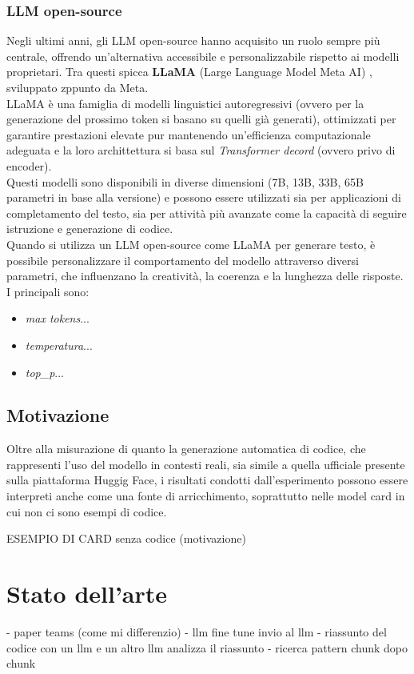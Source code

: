 \documentclass{article}
\begin{document}
\subsubsection{LLM open-source}
Negli ultimi anni, gli LLM open-source hanno acquisito un ruolo sempre più centrale, offrendo un’alternativa accessibile e personalizzabile rispetto ai modelli proprietari. Tra questi spicca \textbf{LLaMA} (Large Language Model Meta AI) \cite{journals/corr/abs-2302-13971}, sviluppato zppunto da Meta.\\
LLaMA è una famiglia di modelli linguistici autoregressivi (ovvero per la generazione del prossimo token si basano su quelli già generati), ottimizzati per garantire prestazioni elevate pur mantenendo un’efficienza computazionale adeguata e la loro archittettura si basa sul \textit{Transformer decord} (ovvero privo di encoder).\\
Questi modelli sono disponibili in diverse dimensioni (7B, 13B, 33B, 65B parametri in base alla versione) e possono essere utilizzati sia per applicazioni di completamento del testo, sia per attività più avanzate come la capacità di seguire istruzione e generazione di codice.\\
Quando si utilizza un LLM open-source come LLaMA per generare testo, è possibile personalizzare il comportamento del modello attraverso diversi parametri, che influenzano la creatività, la coerenza e la lunghezza delle risposte. I principali sono:
\begin{itemize}
    \item \textit{max tokens}...
    \item \textit{temperatura}...
    \item \textit{top\_p}...
\end{itemize}

\subsection{Motivazione}
Oltre alla misurazione di quanto la generazione automatica di codice, che rappresenti l'uso del modello in contesti reali, sia simile a quella ufficiale presente sulla piattaforma Huggig Face, i risultati condotti dall'esperimento possono essere interpreti anche come una fonte di arricchimento, soprattutto nelle model card in cui non ci sono esempi di codice.

ESEMPIO DI CARD senza codice (motivazione)



\section{Stato dell'arte}
- paper teams (come mi differenzio)
- llm fine tune 
invio al llm
- riassunto del codice con un llm e un altro llm analizza il riassunto
- ricerca pattern chunk dopo chunk
\end{document}
